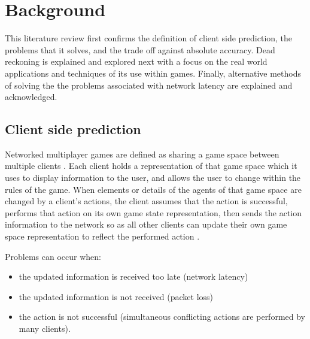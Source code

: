 \documentclass[journal]{IEEEtran}
\begin{document}
\section{Background}

This literature review first confirms the definition of client side prediction, the problems that it solves, and the trade off against absolute accuracy. Dead reckoning is explained and explored next with a focus on the real world applications and techniques of its use within games. Finally, alternative methods of solving the the problems associated with network latency are explained and acknowledged.

\subsection{Client side prediction}

Networked multiplayer games are defined as sharing a game space between multiple clients \cite{diot1999distributed}. Each client holds a representation of that game space which it uses to display information to the user, and allows the user to change within the rules of the game. When elements or details of the agents of that game space are changed by a client's actions, the client assumes that the action is successful, performs that action on its own game state representation, then sends the action information to the network so as all other clients can update their own game space representation to reflect the performed action \cite{bernier2001latency}.

Problems can occur when:
\begin{itemize}
    \item the updated information is received too late (network latency)
    \item the updated information is not received (packet loss)
    \item the action is not successful (simultaneous conflicting actions are performed by many clients).
\end{itemize}
\end{document}

